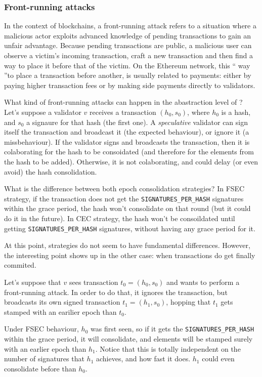 \subsubsection{Front-running attacks}
In the context of blockchains, a front-running attack refers to a situation where
a malicious actor exploits advanced knowledge of pending transactions to gain an
unfair advantage. Because pending transactions are public, a malicious user can
observe a victim's incoming transaction, craft a new transaction and then find a way
to place it before that of the victim. On the Ethereum network, this \textquotedblleft
way \textquotedblright to place a transaction before another, is usually related
to payments: either by paying higher transaction fees or by making side payments
directly to validators.

What kind of front-running attacks can happen in the abastraction level of \hashchain?
Let's suppose a validator $v$ receives a transaction $(h_0, s_0)$, where $h_0$ is a hash,
and $s_0$ a signaure for that hash (the first one). A \textit{speculative} validator can
sign itself the
transaction and broadcast it (the expected behaviour), or
ignore it (a missbehaviour). If the validator signs and broadcasts the transaction,
then it is colaborating for the hash to be consoidated (and therefore for the elements
from the hash to be added).
Otherwise, it is not colaborating, and could delay
(or even avoid) the hash consolidation.

What is the difference between both epoch consolidation strategies?
In FSEC strategy, if the transaction does not get the \texttt{SIGNATURES\_PER\_HASH}
signatures within the grace period, the hash won't consolidate on that round (but it could
do it in the future).
In CEC strategy, the hash won't be consoildated until getting
\texttt{SIGNATURES\_PER\_HASH} signatures, without having any grace period for it.

At this point, strategies do not seem to have fundamental differences.
However, the interesting point shows up in the other case: when transactions do get
finally commited.

Let's suppose that $v$ sees transaction $t_0 = (h_0, s_0)$ and wants to perform a front-running
attack. In order to do that, it ignores the transaction, but broadcasts its own signed
transaction $t_1 = (h_1, s_0)$, hopping that $t_1$ gets stamped with an earilier epoch than $t_0$.

Under FSEC behaviour, $h_0$ was first seen, so if it gets the \texttt{SIGNATURES\_PER\_HASH}
within the grace period, it will consolidate, and elements will be stamped surely with an earlier
epoch than $h_1$.
Notice that this is totally independent on the number of signatures that $h_1$ achieves, and
how fast it does. $h_1$ could even consolidate before than $h_0$.


